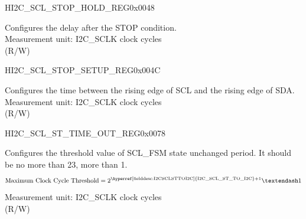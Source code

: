     \begin{register}{H}{I2C\_SCL\_STOP\_HOLD\_REG}{0x0048}\label{regdesc:I2CSCLSTOPHOLDREG}
    \regnewline%
    \begin{regdesc}\begin{reglist}
    \label{fielddesc:I2CSCLSTOPHOLDTIME}\item [I2C\_SCL\_STOP\_HOLD\_TIME] Configures the delay after the STOP condition.\\
    Measurement unit: I2C\_SCLK clock cycles \\ (R/W)
    \end{reglist}\end{regdesc}
    \end{register}


    \begin{register}{H}{I2C\_SCL\_STOP\_SETUP\_REG}{0x004C}\label{regdesc:I2CSCLSTOPSETUPREG}
    \regnewline%
    \begin{regdesc}\begin{reglist}
    \label{fielddesc:I2CSCLSTOPSETUPTIME}\item [I2C\_SCL\_STOP\_SETUP\_TIME] Configures the time between the rising edge of SCL and the rising edge of SDA.\\
    Measurement unit: I2C\_SCLK clock cycles \\ (R/W)
    \end{reglist}\end{regdesc}
    \end{register}


    \begin{register}{H}{I2C\_SCL\_ST\_TIME\_OUT\_REG}{0x0078}\label{regdesc:I2CSCLSTTIMEOUTREG}
    \regnewline%
    \begin{regdesc}\begin{reglist}
    \label{fielddesc:I2CSCLSTTOI2C}\item [I2C\_SCL\_ST\_TO\_I2C] Configures the threshold value of SCL\_FSM state unchanged period. It should be no more than 23, more than 1.\\
    \[
    \text{Maximum Clock Cycle Threshold} = 2^{\text{\hyperref[fielddesc:I2CSCLSTTOI2C]{I2C\_SCL\_ST\_TO\_I2C}} + 1}–1
    \]
    Measurement unit: I2C\_SCLK clock cycles \\ (R/W)
    \end{reglist}\end{regdesc}
    \end{register}


